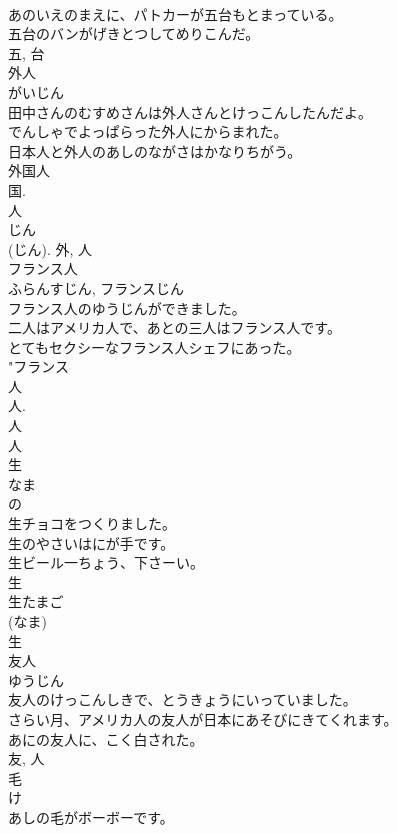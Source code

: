\documentclass[8pt]{extreport}
\begin{document}
\begin{CJK}{UTF8}{min}
\\	あのいえのまえに、パトカーが五台もとまっている。	
\\	五台のバンがげきとつしてめりこんだ。	
\\	五, 台	
\\	外人	
\\	がいじん	
\\	田中さんのむすめさんは外人さんとけっこんしたんだよ。	
\\	でんしゃでよっぱらった外人にからまれた。	
\\	日本人と外人のあしのながさはかなりちがう。	
\\	外国人 
\\	国.
\\	人 
\\	じん 
\\	(じん).	外, 人	
\\	フランス人	
\\	ふらんすじん, フランスじん	
\\	フランス人のゆうじんができました。	
\\	二人はアメリカ人で、あとの三人はフランス人です。	
\\	とてもセクシーなフランス人シェフにあった。	
\\	"フランス 
\\	人 
\\	人. 
\\	人 
\\	人	
\\	生	
\\	なま	
\\	の 
\\	生チョコをつくりました。	
\\	生のやさいはにが手です。	
\\	生ビール一ちょう、下さーい。	
\\	生 
\\	生たまご 
\\	(なま) 
\\	生	
\\	友人	
\\	ゆうじん	
\\	友人のけっこんしきで、とうきょうにいっていました。	
\\	さらい月、アメリカ人の友人が日本にあそびにきてくれます。	
\\	あにの友人に、こく白された。	
\\	友, 人	
\\	毛	
\\	け	
\\	あしの毛がボーボーです。	

\end{CJK}
\end{document}
